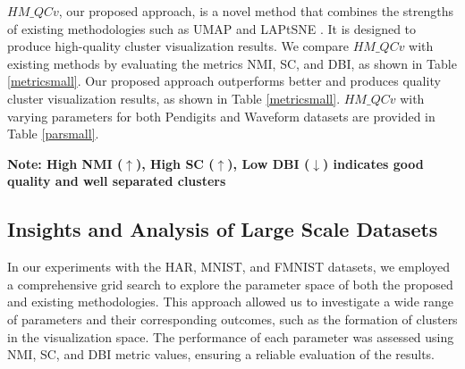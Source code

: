 $HM\_QCv$, our proposed approach, is a novel method that combines the strengths of existing methodologies such as UMAP \cite{umap_reference} and LAPtSNE \cite{sun2023laplacian}. It is designed to produce high-quality cluster visualization results. We compare $HM\_QCv$ with existing methods by evaluating the metrics NMI, SC, and DBI, as shown in Table \ref{metricsmall}. Our proposed approach outperforms better and produces quality cluster visualization results, as shown in Table \ref{metricsmall}. $HM\_QCv$ with varying parameters for both Pendigits and Waveform datasets are provided in Table \ref{parsmall}.

\begin{table}[!htbp]
 \caption{Comparisons of existing NLDR techniques with proposed method on small datasets}
    \centering
   \tiny{\textbf{Note: High NMI ($\uparrow$), High SC ($\uparrow$), Low DBI ($\downarrow$) indicates good quality and well separated clusters}}
    \label{metricsmall}
\end{table}


\subsection{Insights and Analysis of Large Scale Datasets} 


In our experiments with the HAR, MNIST, and FMNIST datasets, we employed a comprehensive grid search to explore the parameter space of both the proposed and existing methodologies. This approach allowed us to investigate a wide range of parameters and their corresponding outcomes, such as the formation of clusters in the visualization space. The performance of each parameter was assessed using NMI, SC, and DBI metric values, ensuring a reliable evaluation of the results.



